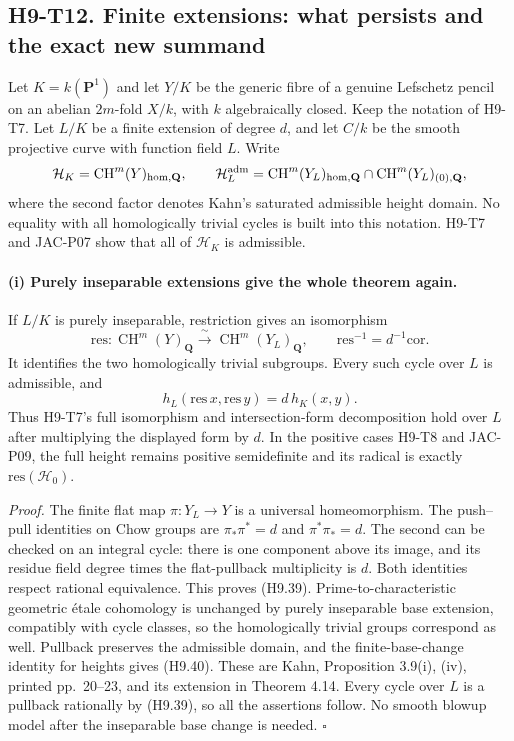 
\subsection*{H9-T12. Finite extensions: what persists and the exact new summand}

Let $K=k(\mathbf P^1)$ and let $Y/K$ be the generic fibre of a genuine
Lefschetz pencil on an abelian $2m$-fold $X/k$, with $k$ algebraically
closed. Keep the notation of H9-T7. Let $L/K$ be a finite extension of
degree $d$, and let $C/k$ be the smooth projective curve with function
field $L$. Write
\[
 \mathcal H_K=\operatorname{CH}^m(Y)_{\rm hom,\mathbf Q},
 \qquad
 \mathcal H_L^{\rm adm}
 =\operatorname{CH}^m(Y_L)_{\rm hom,\mathbf Q}
       \cap\operatorname{CH}^m(Y_L)_{(0),\mathbf Q},
\]
where the second factor denotes Kahn's saturated admissible height
domain. No equality with all homologically trivial cycles is built into
this notation. H9-T7 and JAC-P07 show that all of $\mathcal H_K$ is
admissible.

\paragraph{(i) Purely inseparable extensions give the whole theorem again.}
If $L/K$ is purely inseparable, restriction gives an isomorphism
\[
 \mathrm{res}:\operatorname{CH}^m(Y)_{\mathbf Q}
             \xrightarrow{\ \sim\ }
             \operatorname{CH}^m(Y_L)_{\mathbf Q},
 \qquad \mathrm{res}^{-1}=d^{-1}\mathrm{cor}.                \tag{H9.39}
\]
It identifies the two homologically trivial subgroups. Every such
cycle over $L$ is admissible, and
\[
 h_L(\mathrm{res}\,x,\mathrm{res}\,y)=d\,h_K(x,y).           \tag{H9.40}
\]
Thus H9-T7's full isomorphism and intersection-form decomposition hold
over $L$ after multiplying the displayed form by $d$. In the positive
cases H9-T8 and JAC-P09, the full height remains positive semidefinite
and its radical is exactly $\mathrm{res}(\mathcal H_0)$.

\emph{Proof.} The finite flat map $\pi:Y_L\to Y$ is a universal
homeomorphism. The push--pull identities on Chow groups are
$\pi_*\pi^*=d$ and $\pi^*\pi_*=d$. The second can be checked on an
integral cycle: there is one component above its image, and its residue
field degree times the flat-pullback multiplicity is $d$. Both
identities respect rational equivalence. This proves (H9.39).
Prime-to-characteristic geometric \'etale cohomology is unchanged by
purely inseparable base extension, compatibly with cycle classes, so
the homologically trivial groups correspond as well. Pullback preserves
the admissible domain, and the finite-base-change identity for heights
gives (H9.40). These are Kahn, Proposition 3.9(i), (iv), printed
pp.~20--23, and its extension in Theorem 4.14. Every cycle over $L$
is a pullback rationally by (H9.39), so all the assertions follow.
No smooth blowup model after the inseparable base change is needed.
\hfill$\square$


